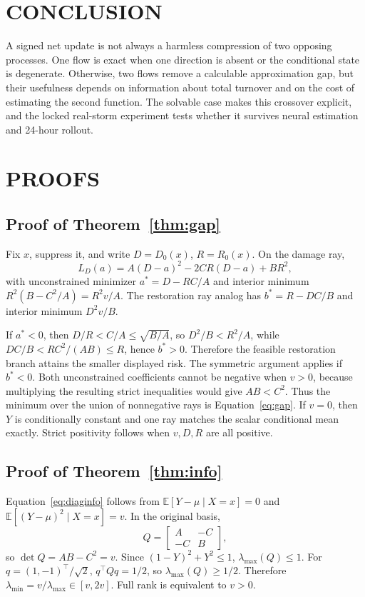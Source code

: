 \documentclass[twoside]{article}
\newcommand{\E}{\mathbb{E}}
\theoremstyle{plain}
\theoremstyle{definition}
\theoremstyle{remark}
\begin{document}
\section{CONCLUSION}

A signed net update is not always a harmless compression of two opposing
processes. One flow is exact when one direction is absent or the conditional
state is degenerate. Otherwise, two flows remove a calculable approximation
gap, but their usefulness depends on information about total turnover and on
the cost of estimating the second function. The solvable case makes this
crossover explicit, and the locked real-storm experiment tests whether it
survives neural estimation and 24-hour rollout.



\clearpage
\appendix
\onecolumn

\section{PROOFS}

\subsection{Proof of Theorem~\ref{thm:gap}}
Fix \(x\), suppress it, and write \(D=D_0(x)\), \(R=R_0(x)\). On the
damage ray,
\[
L_D(a)=A(D-a)^2-2CR(D-a)+BR^2,
\]
with unconstrained minimizer \(a^*=D-RC/A\) and interior minimum
\(R^2(B-C^2/A)=R^2v/A\). The restoration ray analog has
\(b^*=R-DC/B\) and interior minimum \(D^2v/B\).

If \(a^*<0\), then \(D/R<C/A\le\sqrt{B/A}\), so
\(D^2/B<R^2/A\), while
\(DC/B<R C^2/(AB)\le R\), hence \(b^*>0\). Therefore the feasible
restoration branch attains the smaller displayed risk. The symmetric argument
applies if \(b^*<0\). Both unconstrained coefficients cannot be negative when
\(v>0\), because multiplying the resulting strict inequalities would give
\(AB<C^2\). Thus the minimum over the union of nonnegative rays is
Equation~\eqref{eq:gap}. If \(v=0\), then \(Y\) is conditionally constant and
one ray matches the scalar conditional mean exactly. Strict positivity follows
when \(v,D,R\) are all positive.

\subsection{Proof of Theorem~\ref{thm:info}}
Equation~\eqref{eq:diaginfo} follows from
\(\E[Y-\mu\mid X=x]=0\) and \(\E[(Y-\mu)^2\mid X=x]=v\). In the original
basis,
\[
Q=\begin{bmatrix}A&-C\\-C&B\end{bmatrix},
\]
so \(\det Q=AB-C^2=v\). Since
\((1-Y)^2+Y^2\le1\), \(\lambda_{\max}(Q)\le1\). For
\(q=(1,-1)^\top/\sqrt2\), \(q^\top Qq=1/2\), so
\(\lambda_{\max}(Q)\ge1/2\). Therefore
\(\lambda_{\min}=v/\lambda_{\max}\in[v,2v]\). Full rank is equivalent to
\(v>0\).
\end{document}
